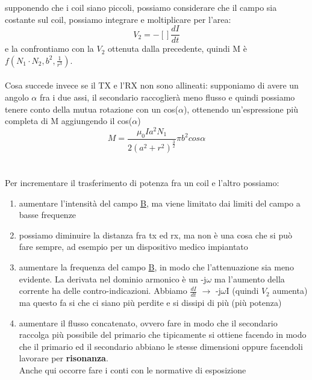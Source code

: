 \documentclass[oneside, 12pt]{extbook}
\begin{document}
supponendo che i coil siano piccoli, possiamo considerare che il campo sia costante sul coil, possiamo integrare e moltiplicare per l'area:
\begin{equation}
	V_2 = -[] \frac{dI}{dt}
\end{equation}
e la confrontiamo con la $V_2$ ottenuta dalla precedente, quindi M è $f(N_1\cdot N_2, b^2, \frac{1}{r^3})$.\\\\Cosa succede invece se il TX e l'RX non sono allineati: supponiamo di avere un angolo $\alpha$ fra i due assi, il secondario raccoglierà meno flusso e quindi possiamo tenere conto della mutua rotazione con un cos($\alpha$), ottenendo un'espressione più completa di M aggiungendo il cos($\alpha$)
\begin{equation}
M = 	\dfrac{\mu_0 I a^2 N_1}{2(a^2 + r^2)^{\frac{3}{2}}} \pi b^2 cos\alpha
\end{equation}
\\\\Per incrementare il trasferimento di potenza fra un coil e l'altro possiamo:
\begin{enumerate}
	\item aumentare l'intensità del campo \underline{B}, ma viene limitato dai limiti del campo a basse frequenze
	\item possiamo diminuire la distanza fra tx ed rx, ma non è una cosa che si può fare sempre, ad esempio per un dispositivo medico impiantato
	\item aumentare la frequenza del campo \underline{B}, in modo che l'attenuazione sia meno evidente. La derivata nel dominio armonico è un -j$\omega$ ma l'aumento della corrente ha delle contro-indicazioni. Abbiamo $\frac{dI}{dt}$ $\rightarrow$ -j$\omega$I (quindi $V_2$ aumenta) ma questo fa si che ci siano più perdite e si dissipi di più (più potenza)
	\item aumentare il flusso concatenato, ovvero fare in modo che il secondario raccolga più possibile del primario che tipicamente si ottiene facendo in modo che il primario ed il secondario abbiano le stesse dimensioni oppure facendoli lavorare per \textbf{risonanza}.\\Anche qui occorre fare i conti con le normative di esposizione
\end{enumerate}
\end{document}
